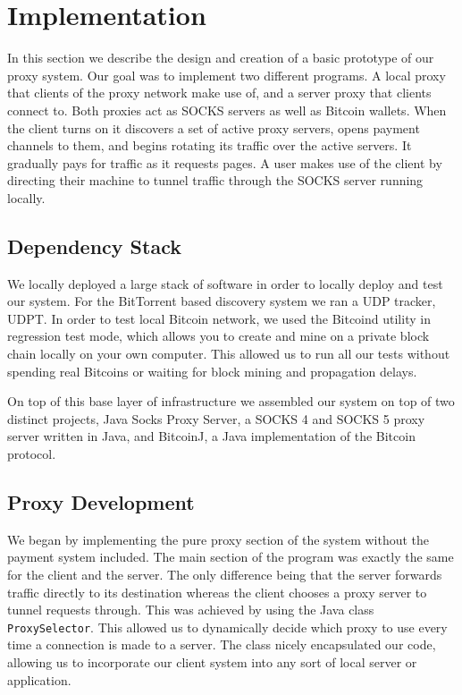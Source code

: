 \section{Implementation}
\label{sec:eval}

In this section we describe the design and creation of a basic prototype of our proxy system. Our goal was to implement two different programs. A local proxy that clients of the proxy network make use of, and a server proxy that clients connect to. Both proxies act as SOCKS servers as well as Bitcoin wallets. When the client turns on it discovers a set of active proxy servers, opens payment channels to them, and begins rotating its traffic over the active servers. It gradually pays for traffic as it requests pages. A user makes use of the client by directing their machine to tunnel traffic through the SOCKS server running locally.

\subsection{Dependency Stack}
We locally deployed a large stack of software in order to locally deploy and test our system. For the BitTorrent based discovery system we ran a UDP tracker, UDPT. In order to test local Bitcoin network, we used the Bitcoind utility in regression test mode, which allows you to create and mine on a private block chain locally on your own computer. This allowed us to run all our tests without spending real Bitcoins or waiting for block mining and propagation delays. 

On top of this base layer of infrastructure we assembled our system on top of two distinct projects, Java Socks Proxy Server, a SOCKS 4 and SOCKS 5 proxy server written in Java, and BitcoinJ, a Java implementation of the Bitcoin protocol.

\subsection{Proxy Development}
We began by implementing the pure proxy section of the system without the payment system included. The main section of the program was exactly the same for the client and the server. The only difference being that the server forwards traffic directly to its destination whereas the client chooses a proxy server to tunnel requests through. This was achieved by using the Java class \texttt{ProxySelector}. This allowed us to dynamically decide which proxy to use every time a connection is made to a server. The class nicely encapsulated our code, allowing us to incorporate our client system into any sort of local server or application.

